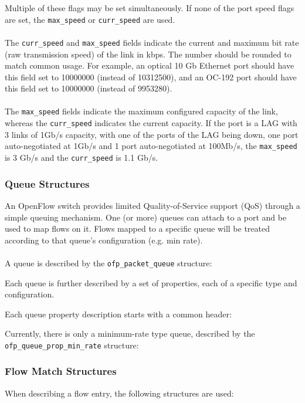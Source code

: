 
Multiple of these flags may be set simultaneously. If none of the port speed flags are set, the \verb|max_speed| or \verb|curr_speed| are used.
\\\\
The \verb|curr_speed| and \verb|max_speed| fields indicate the current and maximum bit rate (raw transmission speed) of the link in kbps. The number should be rounded to match common usage. For example, an optical 10 Gb Ethernet port should have this field set to 10000000 (instead of 10312500), and an OC-192 port should have this field set to 10000000 (instead of 9953280).
\\\\
The \verb|max_speed| fields indicate the maximum configured capacity of the link, whereas the \verb|curr_speed| indicates the current capacity. If the port is a LAG with 3 links of 1Gb/s capacity, with one of the ports of the LAG being down, one port auto-negotiated at 1Gb/s and 1 port auto-negotiated at 100Mb/s, the \verb|max_speed| is 3 Gb/s and the \verb|curr_speed| is 1.1 Gb/s.

\subsubsection{Queue Structures}
\label{cts:qos}
An OpenFlow switch provides limited Quality-of-Service support
  (QoS) through a simple queuing
mechanism. One (or more) queues can attach to a port and be used to map flows
on it. Flows mapped to a specific queue will be treated according to
that queue's configuration (e.g. min rate).
\\\\
A queue is described by the \verb|ofp_packet_queue| structure:

Each queue is further described by a set of properties, each of a
specific type and configuration.

Each queue property description starts with a common header:

Currently, there is only a minimum-rate type queue, described by the
\verb|ofp_queue_prop_min_rate| structure:


\subsubsection{Flow Match Structures}
When describing a flow entry, the following structures are used:



